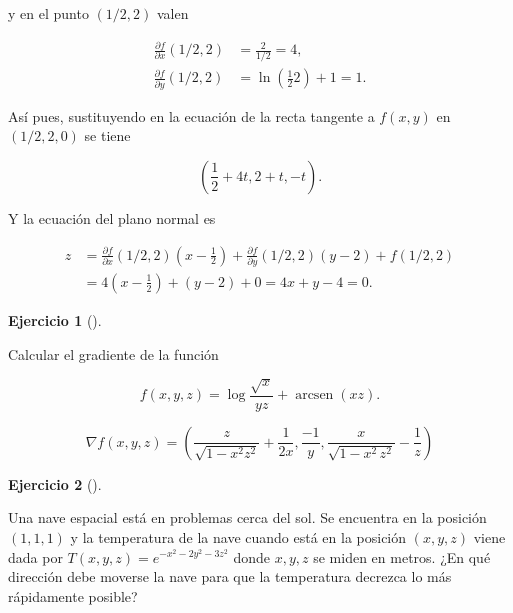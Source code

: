 \documentclass[
  spanish,
  a4paper,
]{scrreport}
\theoremstyle{definition}
\newtheorem{exercise}{Ejercicio}[chapter]
\theoremstyle{remark}
\begin{document}
\begin{tcolorbox}
\begin{enumerate}
  y en el punto \((1/2, 2)\) valen

  \begin{align*}
  \frac{\partial f}{\partial x}(1/2, 2) 
  &= \frac{2}{1/2}
  = 4, \\
  \frac{\partial f}{\partial y}(1/2, 2) 
  &= \ln\left(\frac{1}{2}2\right) + 1
  = 1.
  \end{align*}

  Así pues, sustituyendo en la ecuación de la recta tangente a
  \(f(x,y)\) en \((1/2, 2, 0)\) se tiene

  \[
  \left(\frac{1}{2}+4t, 2 + t, -t\right).
  \]

  Y la ecuación del plano normal es

  \begin{align*}
  z &= 
  \frac{\partial f}{\partial x}(1/2,2)\left(x-\frac{1}{2}\right) + \frac{\partial f}{\partial y}(1/2, 2)(y-2) + f(1/2, 2) \\
  &= 4 \left(x-\frac{1}{2}\right) + (y-2) + 0  
  = 4x + y - 4
  = 0.
  \end{align*}
\end{enumerate}

\end{tcolorbox}

\begin{exercise}[]\protect\hypertarget{exr-gradiente-1}{}\label{exr-gradiente-1}

Calcular el gradiente de la función

\[
f(x,y,z)=\log \frac{\sqrt{x}}{yz}+\operatorname{arcsen}(xz). 
\]

\end{exercise}

\begin{tcolorbox}[enhanced jigsaw, arc=.35mm, bottomrule=.15mm, bottomtitle=1mm, breakable, colback=white, colbacktitle=quarto-callout-tip-color!10!white, colframe=quarto-callout-tip-color-frame, coltitle=black, left=2mm, leftrule=.75mm, opacityback=0, opacitybacktitle=0.6, rightrule=.15mm, title=\textcolor{quarto-callout-tip-color}{\faLightbulb}\hspace{0.5em}{Solución}, titlerule=0mm, toprule=.15mm, toptitle=1mm]

\[
\nabla f(x,y,z) = \left(\frac{z}{\sqrt{1-x^2z^2}}+\frac{1}{2x} ,\frac{-1}{y} , \frac{x}{\sqrt{1-x^2\,z^2}}-\frac{1}{z} \right) 
\]

\end{tcolorbox}

\begin{exercise}[]\protect\hypertarget{exr-nave-espacial}{}\label{exr-nave-espacial}

Una nave espacial está en problemas cerca del sol. Se encuentra en la
posición \((1,1,1)\) y la temperatura de la nave cuando está en la
posición \((x,y,z)\) viene dada por \(T(x,y,z)=e^{-x^2-2y^2-3z^2}\)
donde \(x,y,z\) se miden en metros. ¿En qué dirección debe moverse la
nave para que la temperatura decrezca lo más rápidamente posible?

\end{exercise}
\end{document}
